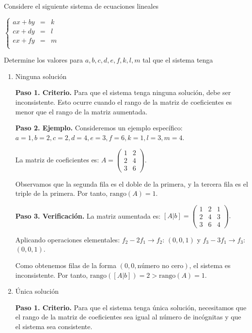 \begin{prob}  
Considere el siguiente sistema de ecuaciones lineales

$ \left\lbrace \begin{array}{ccc}
ax+by&=&k\\
cx+dy&=&l\\
ex+fy&=&m\\
\end{array} \right.  $

Determine los valores para $a, b, c, d, e, f, k, l, m$ tal que el sistema tenga

\begin{enumerate}[$a)$]
\item Ninguna solución 
\begin{myproof}
\textbf{Paso 1. Criterio.} Para que el sistema tenga ninguna solución, debe ser inconsistente. Esto ocurre cuando el rango de la matriz de coeficientes es menor que el rango de la matriz aumentada.

\textbf{Paso 2. Ejemplo.} Consideremos un ejemplo específico: $\boxed{a = 1, b = 2, c = 2, d = 4, e = 3, f = 6, k = 1, l = 3, m = 4}.$

La matriz de coeficientes es: $A = \begin{pmatrix}
1 & 2 \\
2 & 4 \\
3 & 6
\end{pmatrix}.$

Observamos que la segunda fila es el doble de la primera, y la tercera fila es el triple de la primera. Por tanto, $\text{rango}(A) = 1$.

\textbf{Paso 3. Verificación.} La matriz aumentada es: $[A|b] = \begin{pmatrix}
1 & 2 & 1 \\
2 & 4 & 3 \\
3 & 6 & 4
\end{pmatrix}.$

Aplicando operaciones elementales: $f_2 - 2f_1 \rightarrow f_2 $: $(0, 0, 1)$ y $f_3 - 3f_1 \rightarrow f_3$: $(0, 0, 1).$

Como obtenemos filas de la forma $(0, 0, \text{número no cero})$, el sistema es inconsistente.
Por tanto, $\text{rango}([A|b]) = 2 > \text{rango}(A) = 1$.
\end{myproof}

\item Única solución 
\begin{myproof}
\textbf{Paso 1. Criterio.} Para que el sistema tenga única solución, necesitamos que el rango de la matriz de coeficientes sea igual al número de incógnitas y que el sistema sea consistente.


\end{myproof}
\end{enumerate}
\end{prob}
